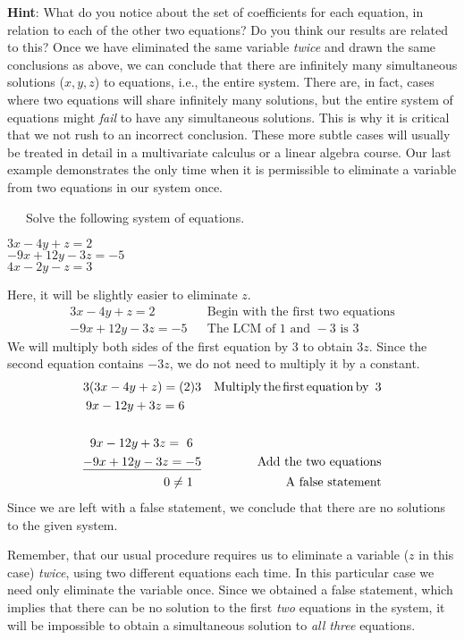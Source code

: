 \begin{example}
{\bf Hint}: What do you notice about the set of coefficients for each equation, in relation to each of the other two equations?  Do you think our results are related to this?\pp
Once we have eliminated the same variable \textit{twice} and drawn the same conclusions as above, we can conclude that there are infinitely many simultaneous solutions ($x,y,z$) to  equations, i.e., the entire system.\pp
There are, in fact, cases where two equations will share infinitely many solutions, but the entire system of equations might \textit{fail} to have any simultaneous solutions.  This is why it is critical that we not rush to an incorrect conclusion.  These more subtle cases will usually be treated in detail in a multivariate calculus or a linear algebra course.\pp
Our last example demonstrates the only time when it is permissible to eliminate a variable from two equations in our system once.%

\end{example}
  
\begin{example}~~~Solve the following system of equations.
\begin{center}
		$3 x - 4 y + z = 2$\\
		$- 9 x + 12 y - 3 z = - 5~~~$\\
		$4 x - 2 y - z = 3$
\end{center}
Here, it will be slightly easier to eliminate $z$.
	\begin{eqnarray*}
    3 x - 4 y + z = 2~~ &  & \text{Begin~with~the~first~two~equations}\\
		- 9 x + 12 y - 3 z = - 5& & \text{The~LCM~of~} 1 \text{~and~} -3 \text{~is~} 3%
	\end{eqnarray*}
		We will multiply both sides of the first equation by 3 to obtain $3z$.  Since the second equation contains $-3z$, we do not need to multiply it by a constant.
	\begin{eqnarray*}
    3 (3 x - 4 y + z) = (2) 3 &  & \tmop{Multiply} \tmop{the} \tmop{first}
    \tmop{equation} \tmop{by~} 3\\
    9 x - 12 y + 3 z = 6~~~~ &  & \\
    &  & \\
    9 x - 12 y + 3 z = ~6~~ &  &\\
    \underline{- 9 x + 12 y - 3 z = - 5} &  & \text{Add~the~two~equations}\\
    0 \neq 1~~ &  & \tmop{A~false~statement}%
  \end{eqnarray*}
Since we are left with a false statement, we conclude that there are no solutions to the given system.%
\end{example}
Remember, that our usual procedure requires us to eliminate a variable ($z$ in this case) \textit{twice}, using two different equations each time.  In this particular case we need only eliminate the variable once.  Since we obtained a false statement, which implies that there can be no solution to the first \textit{two} equations in the system, it will be impossible to obtain a simultaneous solution to \textit{all three} equations.\pp


